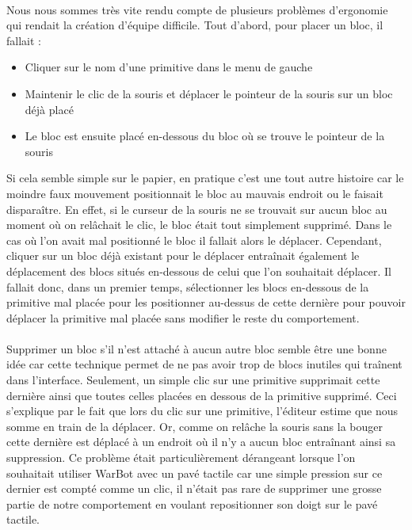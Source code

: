\documentclass{report}
\begin{document}
\paragraph{}
    Nous nous sommes très vite rendu compte de plusieurs problèmes d’ergonomie qui rendait la création d’équipe difficile.
Tout d’abord, pour placer un bloc, il fallait :
\begin{itemize}
\item Cliquer sur le nom d’une primitive dans le menu de gauche
\item Maintenir le clic de la souris et déplacer le pointeur de la souris sur un bloc déjà placé
\item Le bloc est ensuite placé en-dessous du bloc où se trouve le pointeur de la souris
\end{itemize}
Si cela semble simple sur le papier, en pratique c’est une tout autre histoire car le moindre faux mouvement positionnait le bloc au mauvais endroit ou le faisait disparaître.
En effet, si le curseur de la souris ne se trouvait sur aucun bloc au moment où on relâchait le clic, le bloc était tout simplement supprimé. \newline
Dans le cas où l’on avait mal positionné le bloc il fallait alors le déplacer. Cependant, cliquer sur un bloc déjà existant pour le déplacer entraînait également le déplacement des blocs situés en-dessous de celui que l’on souhaitait déplacer. Il fallait donc, dans un premier temps, sélectionner les blocs en-dessous de la primitive mal placée pour les positionner au-dessus de cette dernière pour pouvoir déplacer la primitive mal placée sans modifier le reste du comportement.
\paragraph{}
    Supprimer un bloc s’il n’est attaché à aucun autre bloc semble être une bonne idée car cette technique permet de ne pas avoir trop de blocs inutiles qui traînent dans l’interface. Seulement, un simple clic sur une primitive supprimait cette dernière ainsi que toutes celles placées en dessous de la primitive supprimé. Ceci s’explique par le fait que lors du clic sur une primitive, l’éditeur estime que nous somme en train de la déplacer. Or, comme on relâche la souris sans la bouger cette dernière est déplacé à un endroit où il n’y a aucun bloc entraînant ainsi sa suppression. \newline
Ce problème était particulièrement dérangeant lorsque l’on souhaitait utiliser WarBot avec un pavé tactile car une simple pression sur ce dernier est compté comme un clic, il n’était pas rare de supprimer une grosse partie de notre comportement en voulant repositionner son doigt sur le pavé tactile.
\end{document}
